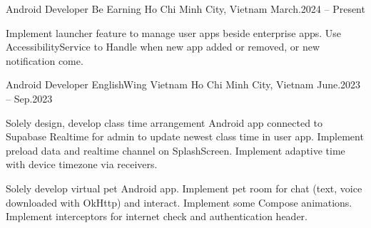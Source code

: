\begin{cventries}

    \cventry
    {Android Developer}
    {Be Earning}
    {Ho Chi Minh City, Vietnam}
    {March.2024 -- Present}
    {
        \begin{cvitems}
            \item {
                Implement launcher feature to manage user apps beside enterprise apps.
                Use AccessibilityService to
                Handle when new app added or removed, or new notification come.

            }
        \end{cvitems}
    }

    \cventry
    {Android Developer}
    {EnglishWing Vietnam}
    {Ho Chi Minh City, Vietnam}
    {June.2023 -- Sep.2023}
    {
        \begin{cvitems}
            \item {
                Solely design, develop class time arrangement Android app connected to Supabase Realtime for admin to update newest class time in user app.
                Implement preload data and realtime channel on SplashScreen.
                Implement adaptive time with device timezone via receivers.
            }
            \item {
                Solely develop virtual pet Android app.
                Implement pet room for chat (text, voice downloaded with OkHttp) and interact.
                Implement some Compose animations.
                Implement interceptors for internet check and authentication header.
            }
        \end{cvitems}
    }
\end{cventries}
